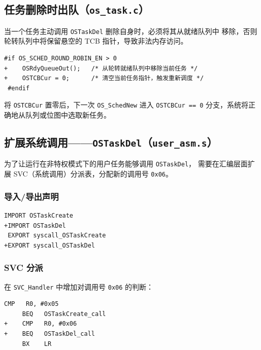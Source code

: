 \documentclass[12pt,a4paper]{article}
\begin{document}
\subsection{任务删除时出队（\texttt{os\_task.c}）}

当一个任务主动调用 \texttt{OSTaskDel} 删除自身时，必须将其从就绪队列中
移除，否则轮转队列中将保留悬空的 TCB 指针，导致非法内存访问。

\begin{lstlisting}[style=diffstyle,caption={os\_task.c — 任务删除时出队}]
 #if OS_SCHED_ROUND_ROBIN_EN > 0
+    OSRdyQueueOut();   /* 从轮转就绪队列中移除当前任务 */
+    OSTCBCur = 0;      /* 清空当前任务指针，触发重新调度 */
 #endif
\end{lstlisting}

将 \texttt{OSTCBCur} 置零后，下一次 \texttt{OS\_SchedNew} 进入
\texttt{OSTCBCur == 0} 分支，系统将正确地从队列或位图中选取新任务。

\subsection{扩展系统调用——\texttt{OSTaskDel}（\texttt{user\_asm.s}）}

为了让运行在非特权模式下的用户任务能够调用 \texttt{OSTaskDel}，
需要在汇编层面扩展 SVC（系统调用）分派表，分配新的调用号 \texttt{0x06}。

\subsubsection{导入/导出声明}

\begin{lstlisting}[style=diffstyle,caption={user\_asm.s — 新增 OSTaskDel 导入导出}]
 IMPORT OSTaskCreate
+IMPORT OSTaskDel
 EXPORT syscall_OSTaskCreate
+EXPORT syscall_OSTaskDel
\end{lstlisting}

\subsubsection{SVC 分派}

在 \texttt{SVC\_Handler} 中增加对调用号 \texttt{0x06} 的判断：

\begin{lstlisting}[style=diffstyle,caption={user\_asm.s — SVC 分派新增 OSTaskDel}]
     CMP   R0, #0x05
     BEQ   OSTaskCreate_call
+    CMP   R0, #0x06
+    BEQ   OSTaskDel_call
     BX    LR
\end{lstlisting}
\end{document}
